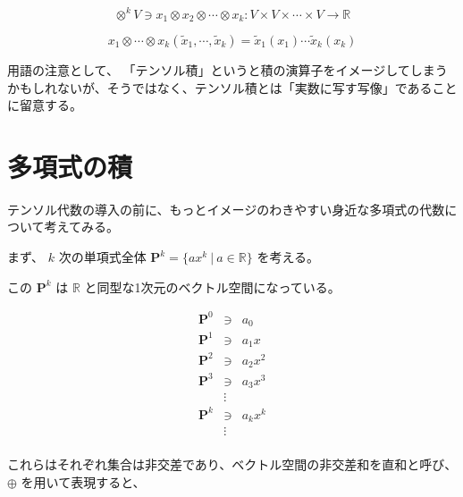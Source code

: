 \documentclass[uplatex,a4j,12pt,dvipdfmx]{jsarticle}
\begin{document}
$$ \otimes^{k} V \ni x_{1} \otimes x_{2} \otimes \cdots \otimes x_{k}: V \times V \times \cdots \times V \to \mathbb{R}$$

$$
	x_{1} \otimes \cdots \otimes x_{k} ( \tilde{x}_{1} , \cdots, \tilde{x}_{k})
	=
	\tilde{x}_{1} (x_{1}) \cdots \tilde{x}_{k} (x_{k})
$$

用語の注意として、
「テンソル積」というと積の演算子をイメージしてしまうかもしれないが、そうではなく、テンソル積とは「実数に写す写像」であることに留意する。

\section{多項式の積}

テンソル代数の導入の前に、もっとイメージのわきやすい身近な多項式の代数について考えてみる。

まず、 $k$ 次の単項式全体 $\mathbf{P}^{k} = \{ ax^{k} \ | \ a \in \mathbb{R} \}$ を考える。

この $\mathbf{P}^{k}$ は $\mathbb{R}$ と同型な1次元のベクトル空間になっている。

\[
	\begin{array}{rcl}
		\mathbf{P}^{0} & \ni    & a_{0}       \\
		\mathbf{P}^{1} & \ni    & a_{1} x     \\
		\mathbf{P}^{2} & \ni    & a_{2} x^{2} \\
		\mathbf{P}^{3} & \ni    & a_{3} x^{3} \\
		               & \vdots &             \\
		\mathbf{P}^{k} & \ni    & a_{k} x^{k} \\
		               & \vdots &             \\
	\end{array}
\]

これらはそれぞれ集合は非交差であり、ベクトル空間の非交差和を直和と呼び、$\oplus$ を用いて表現すると、
\end{document}
